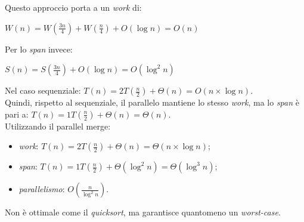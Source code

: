 \newpage

Questo approccio porta a un \textit{work} di:
\begin{center}
	$W(n) = W(\frac{3n}{4}) + W(\frac{n}{4}) + O(\log{n}) = O(n)$
\end{center}
Per lo \textit{span} invece:
\begin{center}
	$S(n) = S(\frac{3n}{4}) + O(\log{n}) = O(\log^{2}n)$
\end{center}
Nel caso sequenziale: $T(n) = 2T(\frac{n}{2}) + \Theta(n) = O(n\times \log{n})$. \\
Quindi, rispetto al sequenziale, il parallelo mantiene lo stesso \textit{work}, ma lo \textit{span} è pari a: $T(n) = 1T(\frac{n}{2}) + \Theta(n) = \Theta(n)$. \\
Utilizzando il parallel merge:
\begin{itemize}
	\item \textit{work}: $T(n) = 2T(\frac{n}{2}) + \Theta(n) = \Theta(n\times \log{n})$;
	\item \textit{span}: $T(n) = 1T(\frac{n}{2}) + \Theta(\log^{2}{n}) = \Theta(\log^{3}{n})$;
	\item \textit{parallelismo}: $O(\frac{n}{\log^{2}{n}})$.
\end{itemize}
Non è ottimale come il \textit{quicksort}, ma garantisce quantomeno un \textit{worst-case}.